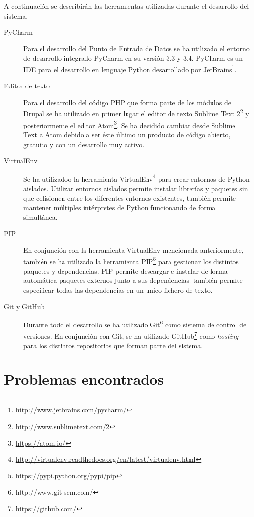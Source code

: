 A continuación se describirán las herramientas utilizadas durante el desarrollo del sistema.
\begin{description}
	\item[PyCharm]
		Para el desarrollo del Punto de Entrada de Datos se ha utilizado el entorno de desarrollo integrado PyCharm en su versión 3.3 y 3.4.  PyCharm es un IDE para el desarrollo en lenguaje Python desarrollado por JetBrains\footnote{\url{http://www.jetbrains.com/pycharm/}}.
	\item[Editor de texto]
		Para el desarrollo del código PHP que forma parte de los módulos de Drupal se ha utilizado en primer lugar el editor de texto Sublime Text 2\footnote{\url{http://www.sublimetext.com/2}} y posteriormente el editor Atom\footnote{\url{https://atom.io/}}.  Se ha decidido cambiar desde Sublime Text a Atom debido a ser éste último un producto de código abierto, gratuito y con un desarrollo muy activo.
	\item[VirtualEnv]
		Se ha utilizadoo la herramienta VirtualEnv\footnote{\url{http://virtualenv.readthedocs.org/en/latest/virtualenv.html}} para crear entornos de Python aislados.  Utilizar entornos aislados permite instalar librerías y paquetes sin que colisionen entre los diferentes entornos existentes, también permite mantener múltiples intérpretes de Python funcionando de forma simultánea.
	\item[PIP]
		En conjunción con la herramienta VirtualEnv mencionada anteriormente, también se ha utilizado la herramienta PIP\footnote{\url{https://pypi.python.org/pypi/pip}} para gestionar los distintos paquetes y dependencias.  PIP permite descargar e instalar de forma automática paquetes externos junto a sus dependencias, también permite especificar todas las dependencias en un único fichero de texto.
	\item[Git y GitHub]
		Durante todo el desarrollo se ha utilizado Git\footnote{\url{http://www.git-scm.com/}} como sistema de control de versiones.  En conjunción con Git, se ha utilizado GitHub\footnote{\url{https://github.com/}} como \textit{hosting} para los distintos repositorios que forman parte del sistema.
\end{description}


\section{Problemas encontrados}
\label{implementacion:problemas_encontrados}
